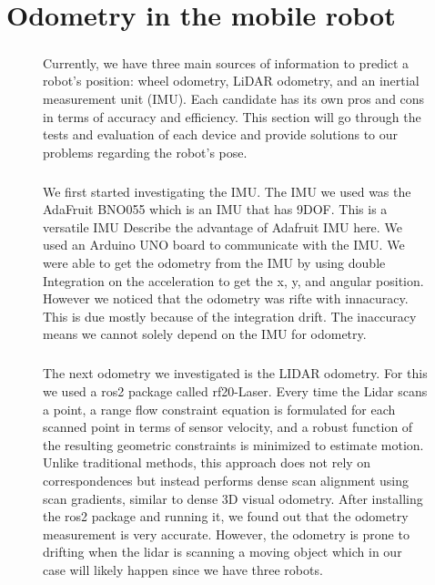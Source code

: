 \chapter{Odometry in the mobile robot}

\begin{figure} [H]

\paragraph*{}

Currently, we have three main sources of information to predict a robot's position: wheel odometry, LiDAR odometry, and an inertial measurement unit (IMU). Each candidate has its own pros and cons in terms of accuracy and efficiency. This section will go through the tests and evaluation of each device and provide solutions to our problems regarding the robot's pose.
\paragraph*{}
We first started investigating the IMU. The IMU we used was the AdaFruit BNO055 which is an IMU that has 9DOF. This is a versatile IMU {Describe the advantage of Adafruit IMU here}. We used an Arduino UNO board to communicate with the IMU. We were able to get the odometry from the IMU by using double Integration on the acceleration to get the x, y, and angular position. However we noticed that the odometry was rifte with innacuracy. This is due mostly because of the integration drift. The inaccuracy means we cannot solely depend on the IMU for odometry.

\paragraph*{}
The next odometry we investigated is the LIDAR odometry. For this we used a ros2 package called rf20-Laser. Every time the Lidar scans a point, a range flow constraint equation is formulated for each scanned point in terms of sensor velocity, and a robust function of the resulting geometric constraints is minimized to estimate motion. Unlike traditional methods, this approach does not rely on correspondences but instead performs dense scan alignment using scan gradients, similar to dense 3D visual odometry. After installing the ros2 package and running it, we found out that the odometry measurement is very accurate. However, the odometry is prone to drifting when the lidar is scanning a moving object which in our case will likely happen since we have three robots. 


\end{figure}
